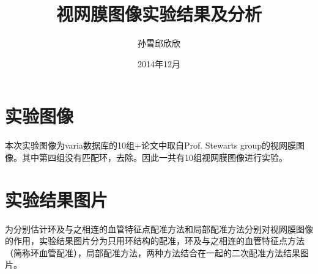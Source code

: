 \documentclass[12pt]{article}
\begin{document}
\title{\vspace{-2em}视网膜图像实验结果及分析\vspace{-0.7em}}
\author{孙雪\;邱欣欣}
\date{\vspace{-0.7em}2014年12月\vspace{-0.7em}}
\maketitle\thispagestyle{fancy}

\section{实验图像}

本次实验图像为varia数据库的10组+论文中取自Prof. Stewarts group的视网膜图像。其中第四组没有匹配环，去除。因此一共有10组视网膜图像进行实验。

\section{实验结果图片}

为分别估计环及与之相连的血管特征点配准方法和局部配准方法分别对视网膜图像的作用，实验结果图片分为只用环结构的配准，环及与之相连的血管特征点方法（简称环血管配准），局部配准方法，两种方法结合在一起的二次配准方法结果图片。
\end{document}
